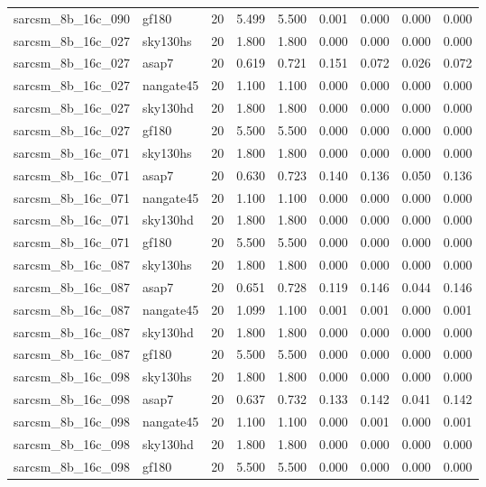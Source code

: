 \begin{tabular}{llrrrrrrr}
sarcsm\_8b\_16c\_090 & gf180 & 20 & 5.499 & 5.500 & 0.001 & 0.000 & 0.000 & 0.000 \\
sarcsm\_8b\_16c\_027 & sky130hs & 20 & 1.800 & 1.800 & 0.000 & 0.000 & 0.000 & 0.000 \\
sarcsm\_8b\_16c\_027 & asap7 & 20 & 0.619 & 0.721 & 0.151 & 0.072 & 0.026 & 0.072 \\
sarcsm\_8b\_16c\_027 & nangate45 & 20 & 1.100 & 1.100 & 0.000 & 0.000 & 0.000 & 0.000 \\
sarcsm\_8b\_16c\_027 & sky130hd & 20 & 1.800 & 1.800 & 0.000 & 0.000 & 0.000 & 0.000 \\
sarcsm\_8b\_16c\_027 & gf180 & 20 & 5.500 & 5.500 & 0.000 & 0.000 & 0.000 & 0.000 \\
sarcsm\_8b\_16c\_071 & sky130hs & 20 & 1.800 & 1.800 & 0.000 & 0.000 & 0.000 & 0.000 \\
sarcsm\_8b\_16c\_071 & asap7 & 20 & 0.630 & 0.723 & 0.140 & 0.136 & 0.050 & 0.136 \\
sarcsm\_8b\_16c\_071 & nangate45 & 20 & 1.100 & 1.100 & 0.000 & 0.000 & 0.000 & 0.000 \\
sarcsm\_8b\_16c\_071 & sky130hd & 20 & 1.800 & 1.800 & 0.000 & 0.000 & 0.000 & 0.000 \\
sarcsm\_8b\_16c\_071 & gf180 & 20 & 5.500 & 5.500 & 0.000 & 0.000 & 0.000 & 0.000 \\
sarcsm\_8b\_16c\_087 & sky130hs & 20 & 1.800 & 1.800 & 0.000 & 0.000 & 0.000 & 0.000 \\
sarcsm\_8b\_16c\_087 & asap7 & 20 & 0.651 & 0.728 & 0.119 & 0.146 & 0.044 & 0.146 \\
sarcsm\_8b\_16c\_087 & nangate45 & 20 & 1.099 & 1.100 & 0.001 & 0.001 & 0.000 & 0.001 \\
sarcsm\_8b\_16c\_087 & sky130hd & 20 & 1.800 & 1.800 & 0.000 & 0.000 & 0.000 & 0.000 \\
sarcsm\_8b\_16c\_087 & gf180 & 20 & 5.500 & 5.500 & 0.000 & 0.000 & 0.000 & 0.000 \\
sarcsm\_8b\_16c\_098 & sky130hs & 20 & 1.800 & 1.800 & 0.000 & 0.000 & 0.000 & 0.000 \\
sarcsm\_8b\_16c\_098 & asap7 & 20 & 0.637 & 0.732 & 0.133 & 0.142 & 0.041 & 0.142 \\
sarcsm\_8b\_16c\_098 & nangate45 & 20 & 1.100 & 1.100 & 0.000 & 0.001 & 0.000 & 0.001 \\
sarcsm\_8b\_16c\_098 & sky130hd & 20 & 1.800 & 1.800 & 0.000 & 0.000 & 0.000 & 0.000 \\
sarcsm\_8b\_16c\_098 & gf180 & 20 & 5.500 & 5.500 & 0.000 & 0.000 & 0.000 & 0.000 \\

\end{tabular}
